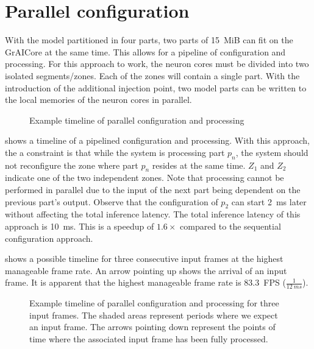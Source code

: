 \section{Parallel configuration}
With the model partitioned in four parts, two parts of \SI{15}{MiB} can fit on the GrAICore at the same time.
This allows for a pipeline of configuration and processing.
For this approach to work, the neuron cores must be divided into two isolated segments/zones.
Each of the zones will contain a single part.
With the introduction of the additional injection point, two model parts can be written to the local memories of the neuron cores in parallel.

\begin{figure}[hbtp]
    \centering
    \resizebox{0.65\linewidth}{!}{
        
    }
    \caption{Example timeline of parallel configuration and processing}
    \label{fig:schedule_parallel_configuration}
\end{figure}

 shows a timeline of a pipelined configuration and processing.
With this approach, the a constraint is that while the system is processing part $p_n$, the system should not reconfigure the zone where part $p_n$ resides at the same time.
$Z_1$ and $Z_2$ indicate one of the two independent zones.
Note that processing cannot be performed in parallel due to the input of the next part being dependent on the previous part's output.
Observe that the configuration of $p_2$ can start \SI{2}{ms} later without affecting the total inference latency.
The total inference latency of this approach is \SI{10}{ms}.
This is a speedup of $1.6\times$ compared to the sequential configuration approach.

 shows a possible timeline for three consecutive input frames at the highest manageable frame rate.
An arrow pointing up shows the arrival of an input frame.
It is apparent that the highest manageable frame rate is \SI{83.3}{FPS} ($\frac{1}{\SI{12}{ms}}$).

\begin{figure}[hbtp]
    \centering
    \resizebox{0.8\linewidth}{!}{
        
    }
    \caption{
    Example timeline of parallel configuration and processing for three input frames.
    The shaded areas represent periods where we expect an input frame.
    The arrows pointing down represent the points of time where the associated input frame has been fully processed.
    }
    \label{fig:schedule_parallel_configuration_extended}
\end{figure}

